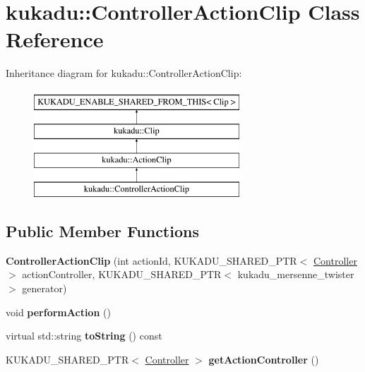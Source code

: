 \hypertarget{classkukadu_1_1ControllerActionClip}{\section{kukadu\-:\-:Controller\-Action\-Clip Class Reference}
\label{classkukadu_1_1ControllerActionClip}
}
Inheritance diagram for kukadu\-:\-:Controller\-Action\-Clip\-:\begin{figure}[H]
\begin{center}
\leavevmode
\includegraphics[height=4.000000cm]{classkukadu_1_1ControllerActionClip}
\end{center}
\end{figure}
\subsection*{Public Member Functions}
\begin{DoxyCompactItemize}
\item 
\hypertarget{classkukadu_1_1ControllerActionClip_a45f6b4b5eb168f5ef80da54d4831cbbe}{{\bfseries Controller\-Action\-Clip} (int action\-Id, K\-U\-K\-A\-D\-U\-\_\-\-S\-H\-A\-R\-E\-D\-\_\-\-P\-T\-R$<$ \hyperlink{classkukadu_1_1Controller}{Controller} $>$ action\-Controller, K\-U\-K\-A\-D\-U\-\_\-\-S\-H\-A\-R\-E\-D\-\_\-\-P\-T\-R$<$ kukadu\-\_\-mersenne\-\_\-twister $>$ generator)}\label{classkukadu_1_1ControllerActionClip_a45f6b4b5eb168f5ef80da54d4831cbbe}

\item 
\hypertarget{classkukadu_1_1ControllerActionClip_acd8f9275a19a8d30d127a61e54593060}{void {\bfseries perform\-Action} ()}\label{classkukadu_1_1ControllerActionClip_acd8f9275a19a8d30d127a61e54593060}

\item 
\hypertarget{classkukadu_1_1ControllerActionClip_a6c2d2f8dde18dd4294eaab5060ce62bf}{virtual std\-::string {\bfseries to\-String} () const }\label{classkukadu_1_1ControllerActionClip_a6c2d2f8dde18dd4294eaab5060ce62bf}

\item 
\hypertarget{classkukadu_1_1ControllerActionClip_a2154f9c71a3c74fb7ab78d8fd7f40e22}{K\-U\-K\-A\-D\-U\-\_\-\-S\-H\-A\-R\-E\-D\-\_\-\-P\-T\-R$<$ \hyperlink{classkukadu_1_1Controller}{Controller} $>$ {\bfseries get\-Action\-Controller} ()}\label{classkukadu_1_1ControllerActionClip_a2154f9c71a3c74fb7ab78d8fd7f40e22}

\end{DoxyCompactItemize}
